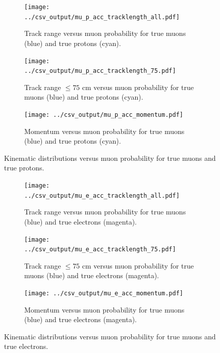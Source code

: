 \begin{figure}[htp]
\centering
	\begin{subfigure}[b]{.475\textwidth}
		\centering
		\texttt{[image: ../csv\_output/mu\_p\_acc\_tracklength\_all.pdf]}
		\caption{Track range versus muon probability for true muons (blue) and true protons (cyan).}
		\label{fig:mup_tracklength}
	\end{subfigure}
	\begin{subfigure}[b]{.475\textwidth}
		\centering
		\texttt{[image: ../csv\_output/mu\_p\_acc\_tracklength\_75.pdf]}
		\caption{Track range $\leq 75$ cm versus muon probability for true muons (blue) and true protons (cyan).}
		\label{fig:mup_tracklength75}
	\end{subfigure}
	\begin{subfigure}[b]{.475\textwidth}
		\centering
		\texttt{[image: ../csv\_output/mu\_p\_acc\_momentum.pdf]}
		\caption{Momentum versus muon probability for true muons (blue) and true protons (cyan).}
		\label{fig:mup_momentum}
	\end{subfigure}
\caption{Kinematic distributions versus muon probability for true muons and true protons.}
\label{fig:mup_kinematics}
\end{figure}

\begin{figure}[htp]
\centering
	\begin{subfigure}[b]{.475\textwidth}
		\centering
		\texttt{[image: ../csv\_output/mu\_e\_acc\_tracklength\_all.pdf]}
		\caption{Track range versus muon probability for true muons (blue) and true electrons (magenta).}
		\label{fig:mup_tracklength}
	\end{subfigure}
	\begin{subfigure}[b]{.475\textwidth}
		\centering
		\texttt{[image: ../csv\_output/mu\_e\_acc\_tracklength\_75.pdf]}
		\caption{Track range $\leq 75$ cm versus muon probability for true muons (blue) and true electrons (magenta).}
		\label{fig:mup_tracklength75}
	\end{subfigure}
	\begin{subfigure}[b]{.475\textwidth}
		\centering
		\texttt{[image: ../csv\_output/mu\_e\_acc\_momentum.pdf]}
		\caption{Momentum versus muon probability for true muons (blue) and true electrons (magenta).}
		\label{fig:mup_momentum}
	\end{subfigure}
\caption{Kinematic distributions versus muon probability for true muons and true electrons.}
\label{fig:mue_kinematics}
\end{figure}

